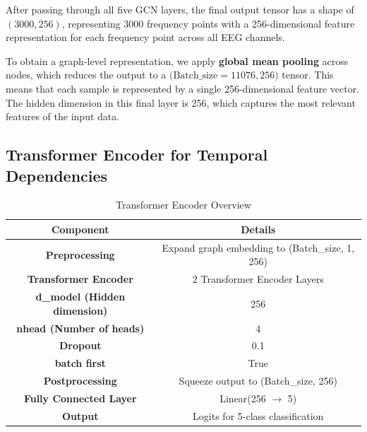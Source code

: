 After passing through all five GCN layers, the final output tensor has a shape of \( (3000, 256) \), representing 3000 frequency points with a 256-dimensional feature representation for each frequency point across all EEG channels.

To obtain a graph-level representation, we apply \textbf{global mean pooling} across nodes, which reduces the output to a \( \text{(Batch\_size}=11076, 256) \) tensor. This means that each sample is represented by a single 256-dimensional feature vector. The hidden dimension in this final layer is 256, which captures the most relevant features of the input data.



 

\subsection{Transformer Encoder for Temporal Dependencies}

\begin{table}[!h]
\centering
\caption{Transformer Encoder Overview}

\begin{tabular}{|c|c|}
\hline
\textbf{Component} & \textbf{Details} \\
\hline
\textbf{Preprocessing} & Expand graph embedding to (Batch\_size, 1, 256) \\
\hline
\textbf{Transformer Encoder} & 2 Transformer Encoder Layers \\
\hline
\textbf{d\_model (Hidden dimension)} & 256 \\
\hline
\textbf{nhead (Number of heads)} & 4 \\
\hline
\textbf{Dropout} & 0.1 \\
\hline
\textbf{batch first} & True \\
\hline
\textbf{Postprocessing} & Squeeze output to (Batch\_size, 256) \\
\hline
\textbf{Fully Connected Layer} & Linear(256 $\rightarrow$ 5) \\
\hline
\textbf{Output} & Logits for 5-class classification \\
\hline
\end{tabular}
\end{table}

